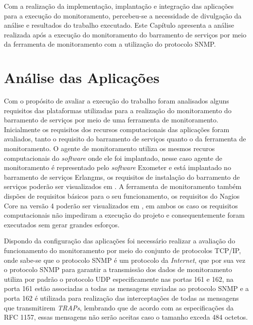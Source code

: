 \label{analise_monitoramento_servicos}

Com a realização da implementação, implantação e integração das aplicações para a execução do monitoramento, percebeu-se a necessidade de divulgação da análise e resultados do trabalho executado. Este Capítulo apresenta a análise realizada após a execução do monitoramento do barramento de serviços por meio da ferramenta de monitoramento com a utilização do protocolo \acrshort{SNMP}.


\section{Análise das Aplicações}
\label{analise}
Com o propósito de avaliar a execução do trabalho foram analisados alguns requisitos das plataformas utilizadas para a realização do monitoramento do barramento de serviços por meio de uma ferramenta de monitoramento. Inicialmente os requisitos dos recursos computacionais das aplicações foram avaliados, tanto o requisito do barramento de serviços quanto o da ferramenta de monitoramento. O agente de monitoramento utiliza os mesmos recuros computacionais do \textit{software} onde ele foi implantado, nesse caso agente de monitoramento é representado pelo \textit{software} Exometer e está implantado no barramento de serviços Erlangms, os requisitos de instalação do barramento de serviços poderão ser visualizados em \cite{erlangms_gitHub}. A ferramenta de monitoramento também dispões de requisitos básicos para o seu funcionamento, os requisitos do Nagios Core\textsuperscript{\textregistered} na versão 4 poderão ser visualizados em \cite{nagios_core_configuration}, em ambos os caso os requisitos computacionais não impediram a execução do projeto e consequentemente foram executados sem gerar grandes esforços.

Dispondo da configuração das aplicações foi necessário realizar a avaliação do funcionamento do monitoramento por meio do conjunto de protocolos TCP/IP, onde sabe-se que o protocolo \acrshort{SNMP} é um protocolo da \textit{Internet}, que por sua vez o protocolo \acrshort{SNMP} para garantir a transmissão dos dados de monitoramento utiliza por padrão o protocolo UDP especificamente nas portas 161 e 162, na porta 161 estão associadas a todas as mensagens enviadas ao protocolo \acrshort{SNMP} e a porta 162 é utilizada para realização das interceptações de todas as mensagens que transmitirem \textit{TRAPs}, lembrando que de acordo com as especificações da RFC 1157, essas mensagens não serão aceitas caso o tamanho exceda 484 octetos\cite{Schoffstall}. 

